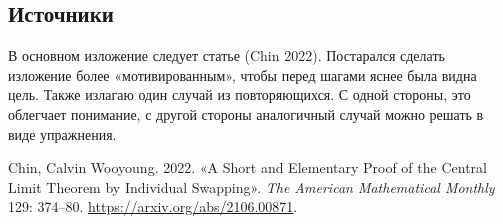 \documentclass[
  letterpaper,
  DIV=11,
  numbers=noendperiod]{scrartcl}
\newlength{\cslhangindent}
\newenvironment{CSLReferences}[2] %
 {\begin{list}{}{%
  \setlength{\itemindent}{0pt}
  \setlength{\leftmargin}{0pt}
  \setlength{\parsep}{0pt}
  \ifodd #1
   \setlength{\leftmargin}{\cslhangindent}
   \setlength{\itemindent}{-1\cslhangindent}
  \fi
  \setlength{\itemsep}{#2\baselineskip}}}
 {\end{list}}
\begin{document}
\subsection{Источники}\label{sec-sources}

В основном изложение следует статье (Chin 2022). Постарался сделать
изложение более «мотивированным», чтобы перед шагами яснее была видна
цель. Также излагаю один случай из повторяющихся. С одной стороны, это
облегчает понимание, с другой стороны аналогичный случай можно решать в
виде упражнения.

\label{refs}
\begin{CSLReferences}{1}{0}
Chin, Calvin Wooyoung. 2022. {«A Short and Elementary Proof of the
Central Limit Theorem by Individual Swapping»}. \emph{The American
Mathematical Monthly} 129: 374--80.
\url{https://arxiv.org/abs/2106.00871}.

\end{CSLReferences}
\end{document}
